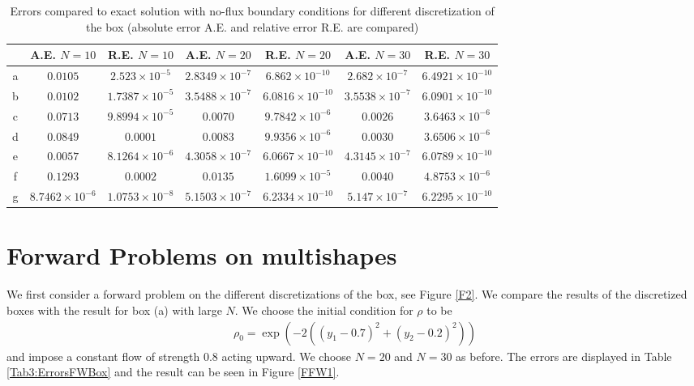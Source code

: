 \documentclass[11pt, a4paper]{article}
\theoremstyle{definition}
\begin{document}
\begin{table}
	\caption{Errors compared to exact solution with no-flux boundary conditions for different discretization of the box (absolute error A.E. and relative error R.E. are compared)}
	\begin{tabular}{ ||c| c| c| c| c |c|c|| }
		\hline
		\hline
		& A.E. $N =10$ & R.E. $N =10$ &A.E. $N =20$ & R.E. $N =20$ &A.E. $N =30$ & R.E. $N =30$ \\ 
		\hline
		a & $0.0105$ & $2.523 \times 10^{-5}$ & $2.8349\times 10^{-7}$ & $6.862\times 10^{-10}$ & $2.682\times 10^{-7}$ & $6.4921\times 10^{-10}$\\  
		b & $0.0102$ & $1.7387\times 10^{-5}$ & $3.5488\times 10^{-7}$ & $6.0816\times 10^{-10}$ & $3.5538\times 10^{-7}$ & $6.0901\times 10^{-10}$\\  
		c & $0.0713$ & $9.8994 \times 10^{-5}$ & $0.0070$ & $9.7842\times 10^{-6}$ & $0.0026$ & $3.6463\times 10^{-6}$\\  
		d & $0.0849$ & $0.0001               $ & $0.0083$ & $9.9356\times 10^{-6}$ & $0.0030$ & $3.6506\times 10^{-6}$\\  
		e & $0.0057$ & $8.1264 \times 10^{-6}$ & $4.3058\times 10^{-7}$ & $6.0667\times 10^{-10}$ & $4.3145\times 10^{-7}$ & $6.0789\times 10^{-10}$\\  
		f & $0.1293$ & $0.0002$ & $0.0135$ & $1.6099\times 10^{-5}$ & $0.0040$ & $4.8753\times 10^{-6}$\\  
		g & $8.7462 \times 10^{-6}$ & $1.0753\times 10^{-8}$ & $5.1503\times 10^{-7}$ & $6.2334\times 10^{-10}$ & $5.147\times 10^{-7}$ & $6.2295\times 10^{-10}$\\  
		\hline
		\hline
	\end{tabular}
	\label{Tab3:ErrorsNoFlux}
\end{table}




\section{Forward Problems on multishapes}
We first consider a forward problem on the different discretizations of the box, see Figure \ref{F2}. We compare the results of the discretized boxes with the result for box (a) with large $N$.
We choose the initial condition for $\rho$ to be
\begin{align*}
	\rho_0 = \exp(-2((y_1 - 0.7 )^2 + (y_2 - 0.2)^2))
\end{align*}
and impose a constant flow of strength $0.8$ acting upward.
We choose $N = 20$ and $N = 30$ as before. The errors are displayed in Table \ref{Tab3:ErrorsFWBox} and the result can be seen in Figure \ref{FFW1}. 
\end{document}
